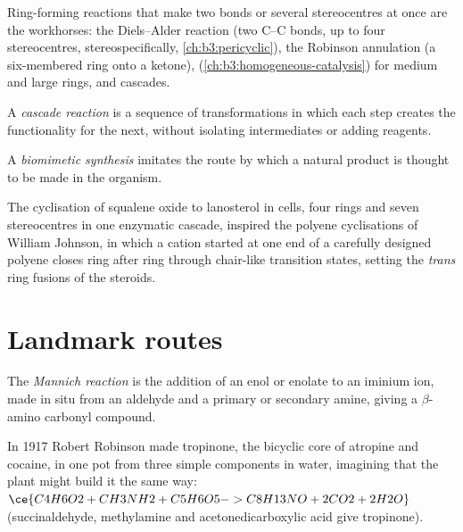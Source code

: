 Ring-forming reactions that make two bonds or several stereocentres at once
are the workhorses: the Diels--Alder reaction (two C--C bonds, up to four
stereocentres, stereospecifically, \cref{ch:b3:pericyclic}), the Robinson
annulation (a six-membered ring onto a ketone), 
(\cref{ch:b3:homogeneous-catalysis}) for medium and large rings, and cascades.

\begin{definition}\label{def:b3:total-synthesis:cascade}
A \emph{cascade reaction} is a sequence of
transformations in which each step creates the functionality for the next,
without isolating intermediates or adding reagents.
\end{definition}

\begin{definition}\label{def:b3:total-synthesis:biomimetic}
A \emph{biomimetic synthesis} imitates the route
by which a natural product is thought to be made in the organism.
\end{definition}

The cyclisation of squalene oxide to lanosterol in cells, four rings and seven
stereocentres in one enzymatic cascade, inspired the polyene cyclisations of
William Johnson, in which a cation started at one end of a carefully designed
polyene closes ring after ring through chair-like transition states, setting
the \textit{trans} ring fusions of the steroids.

\section{Landmark routes}

\begin{definition}\label{def:b3:total-synthesis:mannich}
The \emph{Mannich reaction} is the addition of an enol
or enolate to an iminium ion, made in situ from an aldehyde and a primary or
secondary amine, giving a $\beta$-amino carbonyl compound.
\end{definition}

In 1917 Robert Robinson made tropinone, the bicyclic core of atropine and
cocaine, in one pot from three simple components in water, imagining that the
plant might build it the same way:
$\ce{C4H6O2 + CH3NH2 + C5H6O5 -> C8H13NO + 2CO2 + 2H2O}$ (succinaldehyde, methylamine and
acetonedicarboxylic acid give tropinone).

